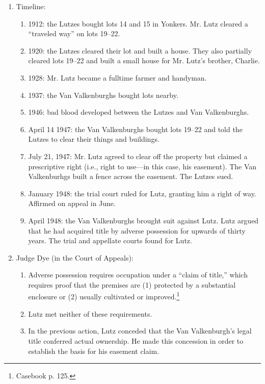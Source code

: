 \begin{enumerate}
    \item Timeline:
    \begin{enumerate}
        \item 1912: the Lutzes bought lots 14 and 15 in Yonkers. Mr. Lutz 
        cleared a ``traveled way'' on lots 19--22.
        \item 1920: the Lutzes cleared their lot and built a house. They also 
        partially cleared lots 19--22 and built a small house for Mr. Lutz's 
        brother, Charlie.
        \item 1928: Mr. Lutz became a fulltime farmer and handyman.
        \item 1937: the Van Valkenburghs bought lots nearby.
        \item 1946: bad blood developed between the Lutzes and Van 
        Valkenburghs.
        \item April 14 1947: the Van Valkenburghs bought lots 19--22 and told the 
        Lutzes to clear their things and buildings.
        \item July 21, 1947: Mr. Lutz agreed to clear off the property but 
        claimed a prescriptive right (i.e., right to use---in this case, his 
        easement). The Van Valkenburhgs built a fence across the easement. The 
        Lutzes sued.
        \item January 1948: the trial court ruled for Lutz, granting him a 
        right of way. Affirmed on appeal in June.
        \item April 1948: the Van Valkenburghs brought suit against Lutz. Lutz 
        argued that he had acquired title by adverse possession for upwards of 
        thirty years. The trial and appellate courts found for Lutz.
    \end{enumerate}
    \item Judge Dye (in the Court of Appeals):
    \begin{enumerate}
        \item Adverse possession requires occupation under a ``claim of 
        title,'' which requires proof that the premises are (1) protected by a 
        substantial enclosure or (2) usually cultivated or 
        improved.\footnote{Casebook p. 125.}
        \item Lutz met neither of these requirements.
        \item In the previous action, Lutz conceded that the Van 
        Valkenburgh's legal title conferred actual ownership. He made this 
        concession in order to establish the basis for his easement claim. 

\end{enumerate}
\end{enumerate}
